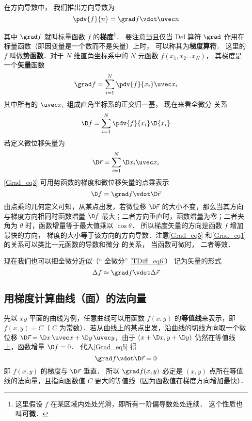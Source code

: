

在方向导数中， 我们推出方向导数为
\begin{equation}\label{Grad_eq1}
\pdv{f}{n} = \grad f \vdot \uvec n
\end{equation}
 
其中 $\grad f$ 就叫标量函数 $f$ 的\textbf{梯度}\footnote{这里假设 $f$ 在某区域内处处光滑，即所有一阶偏导数处处连续． 这个性质也叫\textbf{可微}．}． 要注意当且仅当 Del 算符 $\grad$ 作用在标量函数（即因变量是一个数而不是矢量）上时， 可以称其为\textbf{梯度算符}． 这里的 $f$ 叫做\textbf{势函数}．对于 $N$ 维直角坐标系中的 $N$ 元函数 $f(x_1,x_2\dots x_N)$， 其梯度是一个\textbf{矢量}函数
\begin{equation}
\grad f = \sum_{i=1}^{N}\pdv{f}{x_i}\uvec x_i
\end{equation}
其中所有的 $\uvec x_i$ 组成直角坐标系的正交归一基， 现在来看全微分 关系
\begin{equation}\label{Grad_eq3}
\D f = \sum_{i = 1}^N \pdv{f}{x_i} \D{x_i}
\end{equation}
若定义微位移矢量为
\begin{equation}
\D \vec r = \sum_{i=1}^{N} \D x_i \uvec x_i
\end{equation}
\autoref{Grad_eq3} 可用势函数的梯度和微位移矢量的点乘表示
\begin{equation}\label{Grad_eq5}
\D f = \grad f \vdot \D \vec r
\end{equation}
由点乘的几何定义可知，从某点出发，若微位移 $\D \vec r$ 的大小不变，那么当其方向与梯度方向相同时函数增量 $\D f$ 最大；二者方向垂直时，函数增量为零；二者夹角为 $\theta$ 时，函数增量等于最大值乘以 $\cos \theta$． 所以梯度矢量的方向是函数 $f$ 增加最快的方向， 梯度的大小等于该方向的方向导数．注意\autoref{Grad_eq5} 和\autoref{Grad_eq1} 的关系可以类比一元函数的导数和微分 的关系， 当函数可微时， 二者等效．

现在我们也可以把全微分近似（“ 全微分” \autoref{TDiff_eq6}） 记为矢量的形式
\begin{equation}\label{Grad_eq6}
\Delta f \approx \grad f \vdot \Delta \vec r
\end{equation}

\subsection{用梯度计算曲线（面）的法向量}
先以 $xy$ 平面的曲线为例，任意曲线可以用函数 $f(x,y)$ 的\textbf{等值线}来表示，即 $f(x,y) = C$（ $C$ 为常数）．若从曲线上的某点出发，沿曲线的切线方向取一个微位移 $\D\vec r = \D x\,\uvec x + \D y\,\uvec y$，由于 $(x+\D x, y+\D y)$ 仍然在等值线上，函数增量 $\D f = 0$． 代入\autoref{Grad_eq5} 得
\begin{equation}
\grad f \vdot \D \vec r = 0
\end{equation}
即 $f(x,y)$ 的梯度与 $\D\vec r$ 垂直． 所以 $\grad f(x,y)$ 必定是 $(x,y)$ 点所在等值线的法向量，且指向函数值 $C$ 更大的等值线（因为函数值在梯度方向增加最快）．

